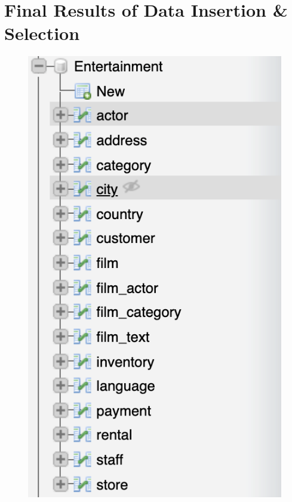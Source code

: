 \documentclass{article}
\begin{document}
\section{Final Results of Data Insertion \& Selection}
	\begin{figure}[H]
		\includegraphics[width=\textwidth]{data_insertion_selection}
	\end{figure}	
\end{document}
